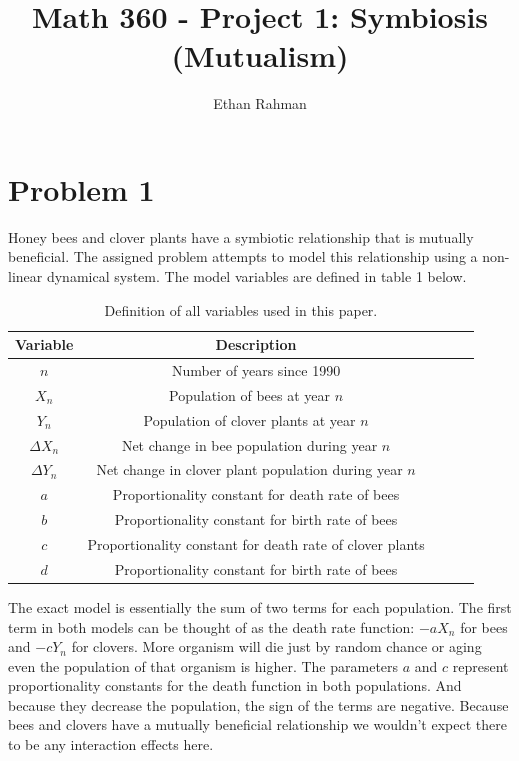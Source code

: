 \documentclass[12pt,a4paper,titlepage]{report}
\title{Math 360 - Project 1: Symbiosis (Mutualism)}
\author{Ethan Rahman}
\begin{document}
	\maketitle
	\pagebreak
	\section*{Problem 1}
		Honey bees and clover plants have a symbiotic relationship that is mutually beneficial. The assigned problem attempts to model this relationship using a non-linear dynamical system. The model variables are defined in table 1 below.
	
		\begin{table}[ht]
			\centering
			\begin{tabular}{ccccc}
				\toprule
				Variable & Description \\ 
				\midrule 
				\(n\) & Number of years since 1990 \\ 
				\(X_{n}\) & Population of bees at year \(n\) \\
				\(Y_{n}\) & Population of clover plants at year \(n\) \\ 
				\(\Delta X_{n}\) & Net change in bee population during year \(n\) \\
				\(\Delta Y_{n}\) & Net change in clover plant population during year \(n\)   \\ 
				\(a\) & Proportionality constant for death rate of bees \\ 
				\(b\) & Proportionality constant for birth rate of bees  \\ 
				\(c\) & Proportionality constant for death rate of clover plants  \\ 
				\(d\) & Proportionality constant for birth rate of bees  \\ 
				\bottomrule
			\end{tabular}
			\caption{Definition of all variables used in this paper.}
		\end{table}
		The exact model is essentially the sum of two terms for each population. The first term in both models can be thought of as the death rate function: \(-aX_{n}\) for bees and \(-cY_{n}\) for clovers. More organism will die just by random chance or aging even the population of that organism is higher. The parameters \(a\) and \(c\) represent proportionality constants for the death function in both populations. And because they decrease the population, the sign of the terms are negative. Because bees and clovers have a mutually beneficial relationship we wouldn't expect there to be any interaction effects here. \\
		
\end{document}
